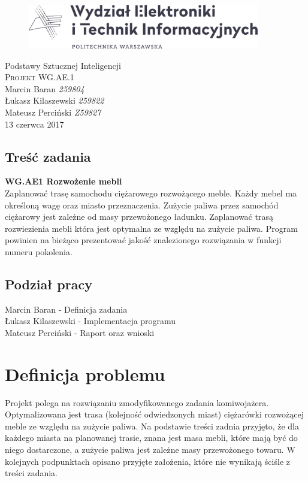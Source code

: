 \documentclass[12pt, oneside, final]{report}
\begin{document}
\begin{titlepage}
	\centering
	\begin{figure}
		\centering
		\includegraphics[width=0.9\textwidth]{logo.pdf}
	\end{figure}
	\vspace*{100pt}
	\LARGE{Podstawy Sztucznej Inteligencji}\\
	\vspace{30pt}
	\textsc{\Huge{Projekt WG.AE.1}}\\
	\vspace{120pt}
	\Large{Marcin Baran \textit{259804}}\\
	\Large{Łukasz Kilaszewski \textit{259822}}\\
	\Large{Mateusz Perciński \textit{Z59827}}\\
	\vfill
	\large{13 czerwca 2017}
\end{titlepage}

\thispagestyle{empty}
\tableofcontents

\section*{Treść zadania}
\textbf{WG.AE1 Rozwożenie mebli} \\
Zaplanować trasę samochodu ciężarowego rozwożącego meble. Każdy mebel ma określoną
wagę oraz miasto przeznaczenia. Zużycie paliwa przez samochód ciężarowy jest zależne od
masy przewożonego ładunku. Zaplanować trasą rozwiezienia mebli która jest optymalna ze
względu na zużycie paliwa. Program powinien na bieżąco prezentować jakość znalezionego
rozwiązania w funkcji numeru pokolenia.
\section*{Podział pracy}
Marcin Baran - Definicja zadania\\
Łukasz Kilaszewski - Implementacja programu\\
Mateusz Perciński - Raport oraz wnioski


\chapter{Definicja problemu}
Projekt polega na rozwiązaniu zmodyfikowanego zadania komiwojażera. Optymalizowana jest trasa (kolejność odwiedzonych miast) ciężarówki rozwożącej meble ze względu na zużycie paliwa. Na podstawie treści zadnia przyjęto, że dla każdego miasta na planowanej trasie, znana jest masa mebli, które mają być do niego dostarczone, a zużycie paliwa jest zależne masy przewożonego towaru. W kolejnych podpunktach opisano przyjęte założenia, które nie wynikają ściśle z treści zadania.
\end{document}
